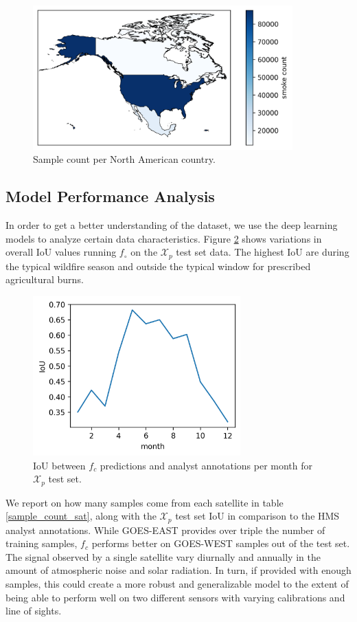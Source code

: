 \documentclass{article}
\begin{document}
\begin{figure}
    \centering
    \includegraphics[width=10cm]{stat_figs/sample_count_per_country.png}
    \caption{Sample count per North American country.}\label{count_per_country}
\end{figure}


\subsection{Model Performance Analysis}

In order to get a better understanding of the dataset, we use the deep learning models to analyze certain data characteristics. Figure \ref{iou_per_month} shows variations in overall IoU values running \(f_{\circ}\) on the \(\mathcal{X}_p\) test set data. The highest IoU are during the typical wildfire season and outside the typical window for prescribed agricultural burns. 

\begin{figure}
    \centering
    \includegraphics[width=8cm]{stat_figs/IoU_per_month.png}
    \caption{IoU between \(f_{c}\) predictions and analyst annotations per month for \(\mathcal{X}_p\) test set.}\label{iou_per_month}
\end{figure}


We report on how many samples come from each satellite in table \ref{sample_count_sat}, along with the \(\mathcal{X}_p\) test set IoU in comparison to the HMS analyst annotations. While GOES-EAST provides over triple the number of training samples, \(f_c\) performs better on GOES-WEST samples out of the test set. The signal observed by a single satellite vary diurnally and annually in the amount of atmospheric noise and solar radiation. In turn, if provided with enough samples, this could create a more robust and generalizable model to the extent of being able to perform well on two different sensors with varying calibrations and line of sights. 
\end{document}
